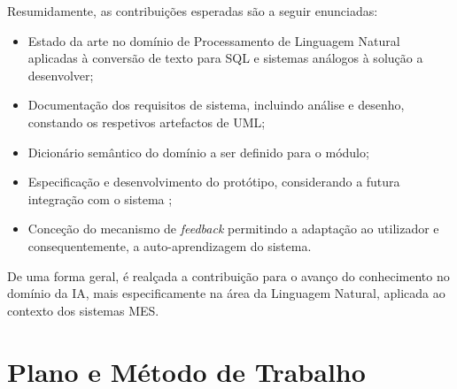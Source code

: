 Resumidamente, as contribuições esperadas são a seguir enunciadas:

\begin{itemize}
    \item
    {
        Estado da arte no domínio de Processamento de Linguagem Natural aplicadas à conversão de texto para \gls{SQL} e sistemas análogos à solução a desenvolver;
    }
    \item 
    {
        Documentação dos requisitos de sistema, incluindo análise e desenho, constando os respetivos artefactos de \gls{UML};
    }
    \item 
    {
        Dicionário semântico do domínio a ser definido para o módulo;
    }
    \item
    {
        Especificação e desenvolvimento do protótipo, considerando a futura integração com o sistema {\productname};
    }
    \item
    {
        Conceção do mecanismo de \textit{feedback} permitindo a adaptação ao utilizador e consequentemente, a auto-aprendizagem do sistema.
    }
\end{itemize}

De uma forma geral, é realçada a contribuição para o avanço do conhecimento no domínio da \gls{IA}, mais especificamente na área da Linguagem Natural, aplicada ao contexto dos sistemas \gls{MES}.







\chapter{Plano e Método de Trabalho}
\label{chap:pre7}

